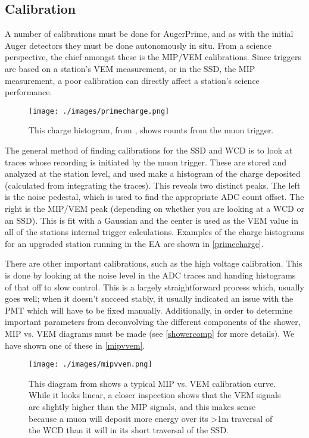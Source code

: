 \subsection{Calibration}
\label{calib}
A number of calibrations must be done for AugerPrime, and as with the initial Auger detectors they must be done autonomously in situ. From a science perspective, the chief amongst these is the MIP/VEM calibrations. Since triggers are based on a station's VEM measurement, or in the SSD, the MIP measurement, a poor calibration can directly affect a station's science performance. 
\begin{figure}[h!]
\begin{center}
\texttt{[image: ./images/primecharge.png]}
\caption[AugerPrime Charge Histograms]{This charge histogram, from \textcite{zizhao}, shows counts from the muon trigger. }
\label{primecharge}
\end{center}
\end{figure}
The general method of finding calibrations for the SSD and WCD is to look at traces whose recording is initiated by the muon trigger. These are stored and analyzed at the station level, and used make a histogram of the charge deposited (calculated from integrating the traces). This reveals two distinct peaks. The left is the noise pedestal, which is used to find the appropriate ADC count offset. The right is the MIP/VEM peak (depending on whether you are looking at a WCD or an SSD). This is fit with a Gaussian and the center is used as the VEM value in all of the stations internal trigger calculations. Examples of the charge histograms for an upgraded station running in the EA are shown in \autoref{primecharge}. 

There are other important calibrations, such as the high voltage calibration. This is done by looking at the noise level in the ADC traces and handing histograms of that off to slow control. This is a largely straightforward process which, usually goes well; when it doesn't succeed stably, it usually indicated an issue with the PMT which will have to be fixed manually. Additionally, in order to determine important parameters from deconvolving the different components of the shower, MIP vs. VEM diagrams must be made (see \autoref{showercomp} for more details). We have shown one of these in \autoref{mipvvem}. 
\begin{figure}[h!]
\begin{center}
\texttt{[image: ./images/mipvvem.png]}
\caption[AugerPrime MIP vs. VEM]{This diagram from \textcite{dynrang} shows a typical MIP vs. VEM calibration curve. While it looks linear, a closer inspection shows that the VEM signals are slightly higher than the MIP signals, and this makes sense because a muon will deposit more energy over its \textgreater 1m traversal of the WCD than it will in its short traversal of the SSD.}
\label{mipvvem}
\end{center}
\end{figure}

